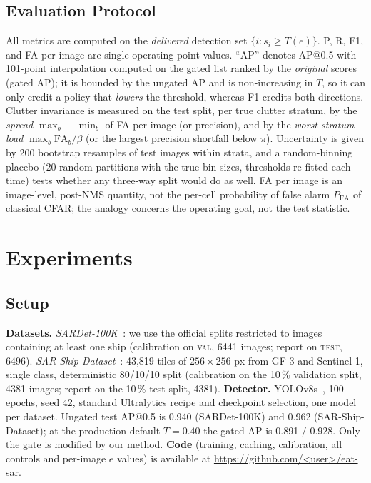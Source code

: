 \documentclass[journal]{IEEEtran}
\newcommand{\TBD}[1]{\textcolor{blue}{#1}}
\providecommand{\linelabel}[1]{}
\begin{document}
\subsection{Evaluation Protocol}
\label{sec:protocol}
\linelabel{ln:ap}All metrics are computed on the \emph{delivered} detection set
$\{i:s_i\ge T(e)\}$. P, R, F1, and FA per image are single operating-point
values. ``AP'' denotes AP@0.5 with 101-point interpolation computed on the
gated list ranked by the \emph{original} scores (gated AP); it is bounded
by the ungated AP and is non-increasing in $T$, so it can only credit a
policy that \emph{lowers} the threshold, whereas F1 credits both
directions.\linelabel{ln:apend} Clutter invariance is measured on the test split, per true
clutter stratum, by the \emph{spread} $\max_b-\min_b$ of FA per image (or
precision), and by the \emph{worst-stratum load} $\max_b\mathrm{FA}_b/\beta$
(or the largest precision shortfall below $\pi$). Uncertainty is given by
200 bootstrap resamples of test images within strata, and a
random-binning placebo (20 random partitions with the true bin sizes,
thresholds re-fitted each time) tests whether any three-way split would do
as well. \linelabel{ln:pfa}FA per image is an image-level, post-NMS
quantity, not the per-cell probability of false alarm $P_{\mathrm{FA}}$
of classical CFAR; the analogy concerns the operating goal, not the test
statistic.\linelabel{ln:pfaend}

\section{Experiments}
\label{sec:experiments}

\subsection{Setup}
\linelabel{ln:data}\textbf{Datasets.}
\textit{SARDet-100K}~\cite{sardet100k}: we use the official splits
restricted to images containing at least one ship (calibration on
\textsc{val}, 6441 images; report on \textsc{test}, 6496).
\textit{SAR-Ship-Dataset}~\cite{sarship2019}: 43{,}819 tiles of
$256\times256$ px from GF-3 and Sentinel-1, single class, deterministic
80/10/10 split (calibration on the 10\,\% validation split, 4381
images; report on the 10\,\% test split, 4381).
\textbf{Detector.} YOLOv8s~\cite{yolov8}, 100 epochs, seed 42, standard
Ultralytics recipe and checkpoint selection, one model per dataset.
Ungated test AP@0.5 is 0.940 (SARDet-100K) and 0.962
(SAR-Ship-Dataset); at the production default $T{=}0.40$ the gated AP is
0.891 / 0.928. Only the gate is modified by our method.
\linelabel{ln:code}\textbf{Code} (training, caching, calibration, all controls and per-image
$e$ values) is available at \TBD{\url{https://github.com/<user>/eat-sar}}.
\end{document}
